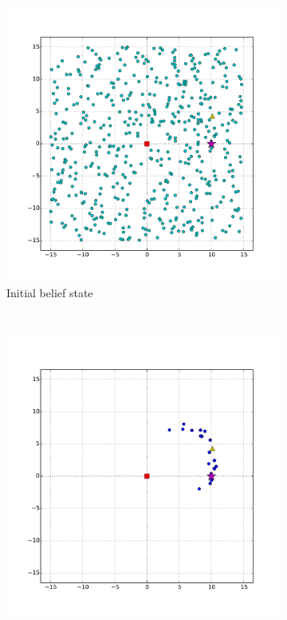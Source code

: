 
\begin{figure}
        \centering
        \begin{subfigure}[b]{0.3\textwidth}
                \includegraphics[width=\textwidth]{beam_bad_heading_initial}
                \caption{Initial belief state}
                \label{fig:beam_bad_heading_init}
        \end{subfigure}%
        ~ %
        \begin{subfigure}[b]{0.3\textwidth}
                \includegraphics[width=\textwidth]{beam_bad_heading_first_obs}

\end{subfigure}
\end{figure}
